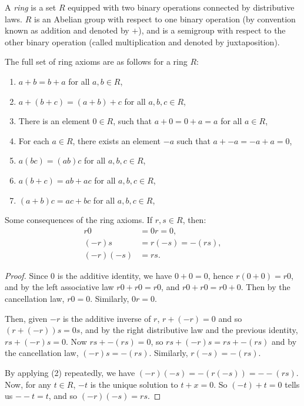   \begin{Def}
    A \emph{ring} is a set $R$ equipped with two binary operations connected by
    distributive laws. $R$ is an Abelian group with respect to one binary
    operation (by convention known as addition and denoted by $+$), and is a
    semigroup with respect to the other binary operation (called multiplication
    and denoted by juxtaposition).

    The full set of ring axioms are as follows for a ring $R$:
    \begin{enumerate}[label=(\roman*)]
        \item
          $ a + b = b + a $ for all $ a, b \in R$,
        \item
          $ a + (b + c) = (a + b) + c $ for all $ a, b, c \in R$,
        \item
          There is an element $0 \in R$, such that
          $a + 0 = 0 + a = a$ for all $a \in R$,
        \item
          For each $a \in R$, there exists an element $-a$ such that
          $a + -a = -a + a = 0$,

        \item
          $ a(bc) = (ab)c $ for all $ a, b, c \in R$,

        \item
          $ a(b+c) = ab + ac $ for all $ a, b, c \in R$,
        \item
          $ (a+b)c = ac + bc $ for all $ a, b, c \in R$,

    \end{enumerate}
  \end{Def}

  \begin{Lemma}
    Some consequences of the ring axioms. If $r, s \in R$, then:
    \begin{align*}
      r0 &= 0r = 0,\\
      (-r)s &= r(-s) = -(rs),\\
      (-r)(-s) &= rs.
    \end{align*}
  \end{Lemma}

  \begin{proof}
    Since $0$ is the additive identity, we have $0 + 0 = 0$,
    hence $r(0+0) = r0$, and by the left associative law
    $ r0 + r0 = r0 $, and $r0 + r0 = r0 + 0$. Then by the
    cancellation law, $r0 = 0$. Similarly, $0r = 0$.

    Then, given $-r$ is the additive inverse of $r$, $r + (-r) = 0$ and so
    $(r + (-r))s = 0s$, and by the right distributive law and the previous
    identity, $rs + (-r)s = 0$. Now $rs + -(rs) = 0$, so
    $rs + (-r)s = rs + -(rs)$ and by the cancellation law, $(-r)s = -(rs)$.
    Similarly, $r(-s) = -(rs)$.

    By applying (2) repeatedly, we have $(-r)(-s) = -(r(-s)) = --(rs)$.
    Now, for any $t \in R$, $-t$ is the unique solution to $t + x = 0$.
    So $(-t) + t = 0$ tells us $--t = t$, and so $(-r)(-s) = rs$.
  \end{proof}

